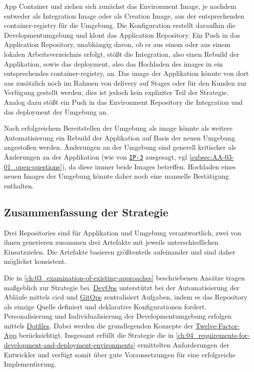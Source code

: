 App Container und  ziehen sich zunächst das Environment Image, je nachdem entweder als Integration Image oder als Creation Image, aus der entsprechenden \Gls{container-registry} für die Umgebung. Die  Konfiguration erstellt daraufhin die Developmentumgebung und klont das Application Repository. Ein Push in das Application Repository, unabhängig davon, ob er aus einem  oder aus einem lokalen Arbeitsverzeichnis erfolgt, stößt die Integration, also einen Rebuild der Applikation, sowie das \Gls{deployment}, also das Hochladen des \Glspl{image} in ein entsprechendes \Gls{container-registry}, an. Das \Gls{image} der Applikation könnte von dort aus zusätzlich noch im Rahmen von \Gls{delivery} auf Stages oder für den Kunden zur Verfügung gestellt werden, dies ist jedoch kein expliziter Teil der  Strategie. Analog dazu stößt ein Push in das Environment Repository die Integration und das \Gls{deployment} der Umgebung an.

Nach erfolgreichem Bereitstellen der Umgebung als \Gls{image} könnte als weitere Automatisierung ein Rebuild der Applikation auf Basis der neuen Umgebung angestoßen werden. Änderungen an der Umgebung sind generell kritischer als Änderungen an der Applikation (wie von \texttt{\hyperref[sec:AA-02_interview-persons]{IP-3}} ausgesagt, \acrshort{vgl} \autoref{subsec:AA-03-01_open-questions}), da diese immer beide Images betreffen. Hochladen eines neuen Images der Umgebung könnte daher noch eine manuelle Bestätigung enthalten. 

\subsection{Zusammenfassung der Strategie}
\label{subsec:05-02-04_summary-of-strategy}

Drei Repositories sind für Applikation und Umgebung verantwortlich, zwei von ihnen generieren zusammen drei Artefakte mit jeweils unterschiedlichen Einsatzzielen. Die Artefakte basieren größtenteils aufeinander und sind daher möglichst konsistent.

Die in \autoref{ch:03_examination-of-existing-approaches} beschriebenen Ansätze tragen maßgeblich zur  Strategie bei. \hyperref[sec:03-01_devops]{DevOps} unterstützt bei der Automatisierung der Abläufe mittels \Gls{cicd} und \hyperref[sec:03-03_gitops]{GitOps} zentralisiert Aufgaben, indem es das Repository als einzige Quelle definiert und deklarative Konfigurationen fordert. Personalisierung und Individualisierung der Developmentumgebung erfolgen mittels \hyperref[sec:03-04_dotfiles]{Dotfiles}. Dabei werden die grundlegenden Konzepte der \hyperref[sec:03-05_concept-of-twelve-factor-app]{Twelve-Factor-App} berücksichtigt. Insgesamt erfüllt die Strategie die in \autoref{ch:04_requirements-for-development-and-deployment-environments} ermittelten Anforderungen der Entwickler und verfügt somit über gute Voraussetzungen für eine erfolgreiche Implementierung.

